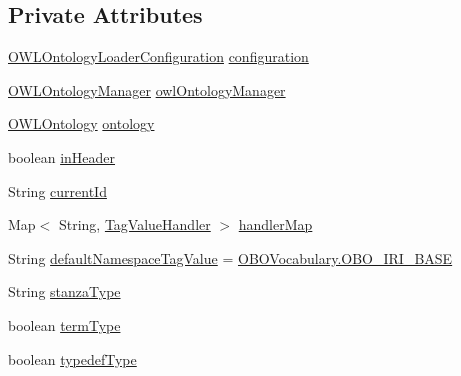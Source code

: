 \subsection*{Private Attributes}
\begin{DoxyCompactItemize}
\item 
\hyperlink{classorg_1_1semanticweb_1_1owlapi_1_1model_1_1_o_w_l_ontology_loader_configuration}{O\-W\-L\-Ontology\-Loader\-Configuration} \hyperlink{classorg_1_1coode_1_1owlapi_1_1obo_1_1parser_1_1_o_b_o_consumer_af08de546e43ef8cc78c637503193da3f}{configuration}
\item 
\hyperlink{interfaceorg_1_1semanticweb_1_1owlapi_1_1model_1_1_o_w_l_ontology_manager}{O\-W\-L\-Ontology\-Manager} \hyperlink{classorg_1_1coode_1_1owlapi_1_1obo_1_1parser_1_1_o_b_o_consumer_a5b5385b8e52f53c0dc596c8e8cae4b08}{owl\-Ontology\-Manager}
\item 
\hyperlink{interfaceorg_1_1semanticweb_1_1owlapi_1_1model_1_1_o_w_l_ontology}{O\-W\-L\-Ontology} \hyperlink{classorg_1_1coode_1_1owlapi_1_1obo_1_1parser_1_1_o_b_o_consumer_a0919da0b2560a2633f92c94dc3ba6e60}{ontology}
\item 
boolean \hyperlink{classorg_1_1coode_1_1owlapi_1_1obo_1_1parser_1_1_o_b_o_consumer_aab3dadbca0ffab2724e2b874cf9aa6a2}{in\-Header}
\item 
String \hyperlink{classorg_1_1coode_1_1owlapi_1_1obo_1_1parser_1_1_o_b_o_consumer_a25441533ff64399a869dc01c1526d154}{current\-Id}
\item 
Map$<$ String, \hyperlink{interfaceorg_1_1coode_1_1owlapi_1_1obo_1_1parser_1_1_tag_value_handler}{Tag\-Value\-Handler} $>$ \hyperlink{classorg_1_1coode_1_1owlapi_1_1obo_1_1parser_1_1_o_b_o_consumer_a009e7ac9accce25df1b1e95365afd37b}{handler\-Map}
\item 
String \hyperlink{classorg_1_1coode_1_1owlapi_1_1obo_1_1parser_1_1_o_b_o_consumer_aa16e47ddbe06bdb7b6e037f40db5bab3}{default\-Namespace\-Tag\-Value} = \hyperlink{enumorg_1_1coode_1_1owlapi_1_1obo_1_1parser_1_1_o_b_o_vocabulary_a100cf24365c118368a03588b58fe2c7d}{O\-B\-O\-Vocabulary.\-O\-B\-O\-\_\-\-I\-R\-I\-\_\-\-B\-A\-S\-E}
\item 
String \hyperlink{classorg_1_1coode_1_1owlapi_1_1obo_1_1parser_1_1_o_b_o_consumer_a6adb3319dca92de132229e302625a45f}{stanza\-Type}
\item 
boolean \hyperlink{classorg_1_1coode_1_1owlapi_1_1obo_1_1parser_1_1_o_b_o_consumer_ac15c51ff07aa21ca21d5b12019cb8752}{term\-Type}
\item 
boolean \hyperlink{classorg_1_1coode_1_1owlapi_1_1obo_1_1parser_1_1_o_b_o_consumer_a42cce8a274013ef9a7d342a98780bae9}{typedef\-Type}

\end{DoxyCompactItemize}
